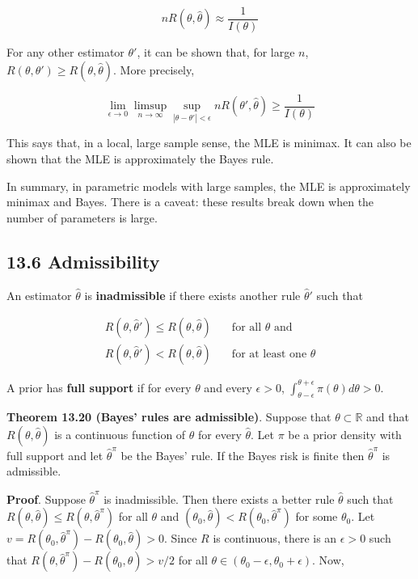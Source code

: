 \[ n R(\theta, \hat{\theta}) \approx \frac{1}{I(\theta)}\]

For any other estimator \(\theta'\), it can be shown that, for large
\(n\), \(R(\theta, \theta') \geq R(\theta, \hat{\theta})\). More
precisely,

\[ \lim_{\epsilon \rightarrow 0} \limsup_{n \rightarrow \infty} \sup_{|\theta - \theta'| < \epsilon} n R(\theta', \hat{\theta}) \geq \frac{1}{I(\theta)} \]

This says that, in a local, large sample sense, the MLE is minimax. It
can also be shown that the MLE is approximately the Bayes rule.

In summary, in parametric models with large samples, the MLE is
approximately minimax and Bayes. There is a caveat: these results break
down when the number of parameters is large.

\subsection*{13.6 Admissibility}\label{admissibility}

An estimator \(\hat{\theta}\) is \textbf{inadmissible} if there exists
another rule \(\hat{\theta}'\) such that

\begin{align*}
R(\theta, \hat{\theta}') \leq R(\theta, \hat{\theta}) & \quad \text{for all } \theta \text{ and} \\
R(\theta, \hat{\theta}') < R(\theta, \hat{\theta}) & \quad \text{for at least one } \theta
\end{align*}

A prior has \textbf{full support} if for every \(\theta\) and every
\(\epsilon > 0\),
\(\int_{\theta - \epsilon}^{\theta + \epsilon} \pi(\theta) d\theta > 0\).

\textbf{Theorem 13.20 (Bayes' rules are admissible)}. Suppose that
\(\theta \subset \mathbb{R}\) and that \(R(\theta, \hat{\theta})\) is a
continuous function of \(\theta\) for every \(\hat{\theta}\). Let
\(\pi\) be a prior density with full support and let
\(\hat{\theta}^\pi\) be the Bayes' rule. If the Bayes risk is finite
then \(\hat{\theta}^\pi\) is admissible.

\textbf{Proof}. Suppose \(\hat{\theta}^\pi\) is inadmissible. Then there
exists a better rule \(\hat{\theta}\) such that
\(R(\theta, \hat{\theta}) \leq R(\theta, \hat{\theta}^\pi)\) for all
\(\theta\) and
\((\theta_{0}, \hat{\theta}) < R(\theta_{0}, \hat{\theta}^\pi)\) for some
\(\theta_{0}\). Let
\(v = R(\theta_{0}, \hat{\theta}^\pi) - R(\theta_{0}, \hat{\theta}) > 0\).
Since \(R\) is continuous, there is an \(\epsilon > 0\) such that
\(R(\theta, \hat{\theta}^\pi) - R(\theta_{0}, \hat{\theta}) > v/2\) for
all \(\theta \in (\theta_{0} - \epsilon, \theta_{0} + \epsilon)\). Now,

